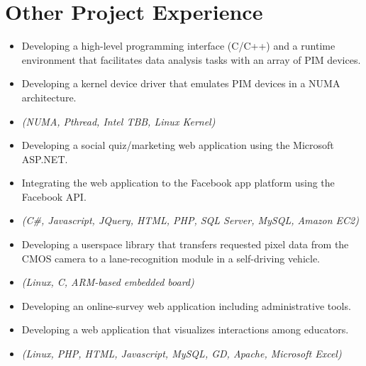 \section{Other Project Experience}

\begin{itemize}
    \item {Developing a high-level programming interface (C/C++) and a runtime environment that
             facilitates data analysis tasks with an array of PIM devices.}
    \item {Developing a kernel device driver that emulates PIM devices in a NUMA architecture.}
    \item {\it\small(NUMA, Pthread, Intel TBB, Linux Kernel)}
\end{itemize}

\begin{itemize}
     \item{Developing a social quiz/marketing web application using the Microsoft ASP.NET.}
     \item{Integrating the web application to the Facebook app platform using the Facebook API.}
     \item{\it\small(C\#, Javascript, JQuery, HTML, PHP, SQL Server, MySQL, Amazon EC2)}
\end{itemize}

\begin{itemize}
 \item {Developing a userspace library that transfers requested pixel data from the CMOS camera
           to a lane-recognition module in a self-driving vehicle.}
 \item{\it\small(Linux, C, ARM-based embedded board)}
\end{itemize}

  \begin{itemize}
     \item{Developing an online-survey web application including administrative tools.}
     \item{Developing a web application that visualizes interactions among educators.}
     \item{\it\small(Linux, PHP, HTML, Javascript, MySQL, GD, Apache, Microsoft Excel)}
  \end{itemize}

